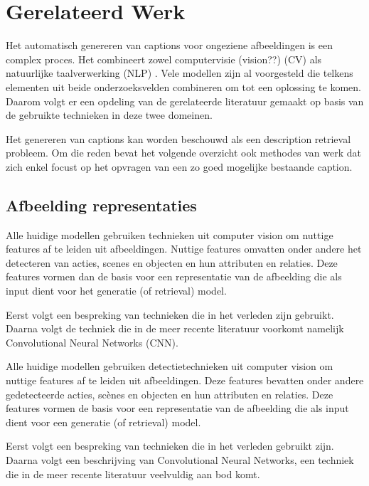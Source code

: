 \chapter{Gerelateerd Werk}
\label{hoofdstuk:related}
Het automatisch genereren van captions voor ongeziene afbeeldingen is een complex proces. Het combineert zowel computervisie (vision??) (CV) als natuurlijke taalverwerking (NLP) . Vele modellen zijn al voorgesteld die telkens elementen uit beide onderzoeksvelden combineren om tot een oplossing te komen. Daarom volgt er een opdeling van de gerelateerde literatuur gemaakt op basis van de gebruikte technieken in deze twee domeinen. 

Het genereren van captions kan worden beschouwd als een description retrieval probleem.\cite{Hodosh}  Om die reden bevat het volgende overzicht ook methodes van werk dat zich enkel focust op het opvragen van een zo goed mogelijke bestaande caption.

\section{Afbeelding representaties}
Alle huidige modellen gebruiken technieken uit computer vision om nuttige features af te leiden uit afbeeldingen. Nuttige features omvatten onder andere het detecteren van acties, scenes en objecten en hun attributen en relaties. \cite{bernardi}  Deze features vormen dan de basis voor een representatie van de afbeelding die als input dient voor het generatie (of retrieval) model. 

Eerst volgt een bespreking van technieken die in het verleden zijn gebruikt. Daarna volgt de techniek die in de meer recente literatuur voorkomt namelijk Convolutional Neural Networks (CNN).

Alle huidige modellen gebruiken detectietechnieken uit computer vision om nuttige features af te leiden uit afbeeldingen. Deze features bevatten onder andere gedetecteerde acties, sc\`enes en objecten en hun attributen en relaties. Deze features vormen de basis voor een representatie van de afbeelding die als input dient voor een generatie (of retrieval) model. 

Eerst volgt een bespreking van technieken die in het verleden gebruikt zijn. Daarna volgt een beschrijving van Convolutional Neural Networks, een techniek die in de meer recente literatuur veelvuldig aan bod komt.

